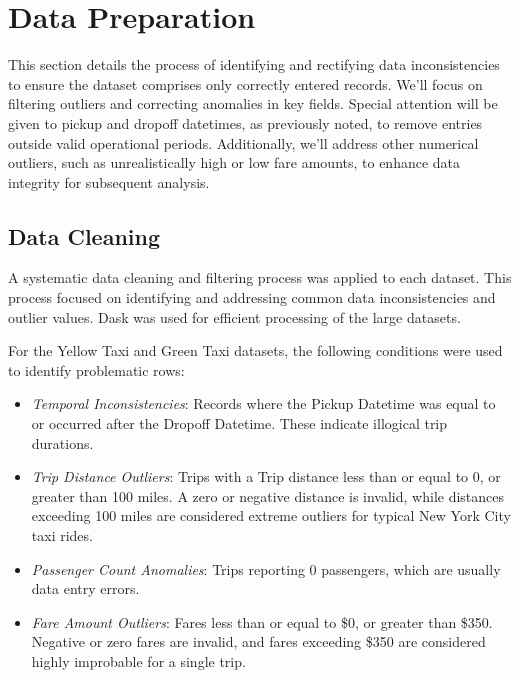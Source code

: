 \documentclass[conference]{IEEEtran}
\begin{document}

\section{Data Preparation}

This section details the process of identifying and rectifying data inconsistencies to ensure the dataset comprises only
correctly entered records. We'll focus on filtering outliers and correcting anomalies in key fields. Special attention
will be given to pickup and dropoff datetimes, as previously noted, to remove entries outside valid operational periods.
Additionally, we'll address other numerical outliers, such as unrealistically high or low fare amounts, to enhance data
integrity for subsequent analysis.

\subsection{Data Cleaning}
A systematic data cleaning and filtering process was applied to each dataset. This process focused on identifying and
addressing common data inconsistencies and outlier values. Dask was used for efficient processing of the large datasets.

For the Yellow Taxi and Green Taxi datasets, the following conditions were used to identify problematic rows:
\begin{itemize}
  \item \emph{Temporal Inconsistencies}: Records where the Pickup Datetime was equal to or occurred after the
    Dropoff Datetime. These indicate illogical trip durations.
  \item \emph{Trip Distance Outliers}: Trips with a Trip distance less than or equal to 0, or greater than 100 miles. A
    zero or negative distance is invalid, while distances exceeding 100 miles are considered extreme outliers for
    typical New York City taxi rides.
  \item \emph{Passenger Count Anomalies}: Trips reporting 0 passengers, which are usually data entry errors.
  \item \emph{Fare Amount Outliers}: Fares less than or equal to \$0, or greater than \$350. Negative or zero fares are
    invalid, and fares exceeding \$350 are considered highly improbable for a single trip.
\end{itemize}
\end{document}
